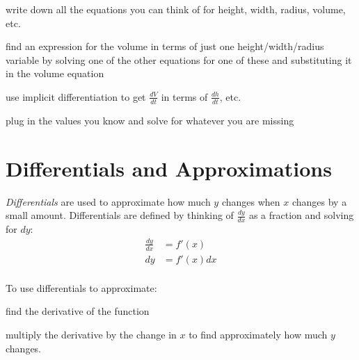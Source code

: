 \documentclass[fleqn]{exam}
\begin{document}
\begin{itemize*}
\item write down all the equations you can think of for height, width, radius, volume, etc.
\item find an expression for the volume in terms of just one height/width/radius variable by solving one of the other
  equations for one of these and substituting it in the volume equation
\item use implicit differentiation to get $\frac{dV}{dt}$ in terms of $\frac{dh}{dt}$, etc.
\item plug in the values you know and solve for whatever you are missing
\end{itemize*}

\section{Differentials and Approximations}
{\em Differentials} are used to approximate how much $y$ changes when $x$ changes by a small amount.  Differentials are
defined by thinking of $\frac{dy}{dx}$ as a fraction and solving for $dy$:
\begin{align*}
  \frac{dy}{dx} &= f'(x) \\
  dy &= f'(x) dx \\
\end{align*}

To use differentials to approximate:
\begin{itemize*}
\item find the derivative of the function
\item multiply the derivative by the change in $x$ to find approximately how much $y$ changes.
\end{itemize*}

\end{document}

